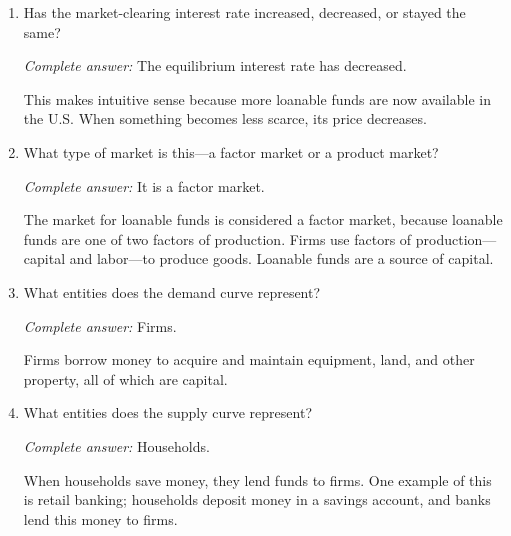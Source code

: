 \documentclass{assignment}
\begin{document}
\begin{enumerate}
\item Has the market-clearing interest rate increased, decreased, or stayed the same?

\begin{solution}
\emph{Complete answer:} The equilibrium interest rate has decreased.

This makes intuitive sense because more loanable funds are now available in the U.S. When something becomes less scarce, its price decreases.
\end{solution}

\item What type of market is this---a factor market or a product market?

\begin{solution}
\emph{Complete answer:} It is a factor market.

The market for loanable funds is considered a factor market, because loanable funds are one of two factors of production. Firms use factors of production---capital and labor---to produce goods. Loanable funds are a source of capital.
\end{solution}

\item What entities does the demand curve represent?

\begin{solution}
\emph{Complete answer:} Firms.

Firms borrow money to acquire and maintain equipment, land, and other property, all of which are capital.
\end{solution}

\item What entities does the supply curve represent?

\begin{solution}
\emph{Complete answer:} Households.

When households save money, they lend funds to firms. One example of this is retail banking; households deposit money in a savings account, and banks lend this money to firms.
\end{solution}

\end{enumerate}
\end{document}
